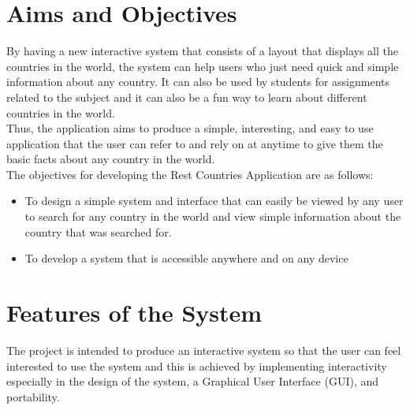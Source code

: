 \documentclass[twoside, a4paper, 12pt]{report}
\begin{document}

\section{Aims and Objectives}
By having a new interactive system that consists of a layout that displays all the countries in the world, the system can help users who just need quick and simple information about any country. It can also be used by students for assignments related to the subject and it can also be a fun way to learn about different countries in the world.\\
\indent
Thus, the application aims to produce a simple, interesting, and easy to use application that the user can refer to and rely on at anytime to give them the basic facts about any country in the world.\\
\indent
The objectives for developing the Rest Countries Application are as follows:
\begin{itemize}
\item To design a simple system and interface that can easily be viewed by any user to search for any country in the world and view simple information about the country that was searched for.
\item To develop a system that is accessible anywhere and on any device
\end{itemize}

\section{Features of the System}
The project is intended to produce an interactive system so that the user can feel interested to use the system and this is achieved by implementing interactivity especially in the design of the system, a Graphical User Interface (GUI), and portability.
\end{document}
